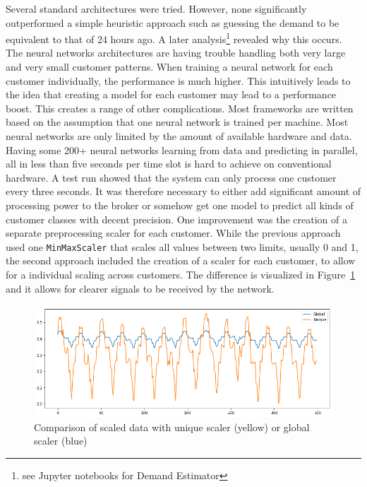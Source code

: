 Several standard architectures were tried. However, none significantly outperformed a simple heuristic approach such as
guessing the demand to be equivalent to that of 24 hours ago. A later analysis\footnote{see Jupyter notebooks for Demand
Estimator}
revealed why this occurs. The neural networks architectures are having trouble handling both very large and very small
customer patterns. When training a neural network for each customer individually, the performance is much higher. This
intuitively leads to the idea that creating a model for each customer may lead to a performance boost. This 
creates a range of other complications. Most frameworks are written based on the assumption that one neural network is
trained per machine. Most neural networks are only limited by the amount of available hardware and data. Having some
200+ neural networks learning from data and predicting in parallel, all in less than five seconds per time slot is hard
to achieve on conventional hardware. A test run showed that the system can only
process one customer every three seconds. It was therefore necessary to either add significant amount of processing
power to the broker or somehow get one model to predict all kinds of customer classes with decent precision. One
improvement was the creation of a separate preprocessing scaler for each customer. While the previous approach used one
\texttt{MinMaxScaler} that scales all values between two limits, usually 0 and 1, the second approach included the
creation of a scaler for each customer, to allow for a individual scaling across customers. The difference is visualized
in Figure~\ref{fig:imgfrosty} and it allows for clearer signals to be received by the network.


\begin{figure}[]
    \centering
    \includegraphics[width=1.0\linewidth]{img/frosty_scaled.png}
    \caption{Comparison of scaled data with unique scaler (yellow) or global scaler (blue)}
    \label{fig:imgfrosty}
\end{figure}

